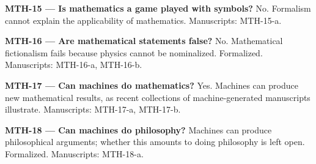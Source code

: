 \documentclass[10pt]{article}
\begin{document}
\textbf{MTH-15 --- Is mathematics a game played with symbols?} No. Formalism cannot explain the applicability of mathematics. Manuscripts: MTH-15-a.

\textbf{MTH-16 --- Are mathematical statements false?} No. Mathematical fictionalism fails because physics cannot be nominalized. Formalized. Manuscripts: MTH-16-a, MTH-16-b.

\textbf{MTH-17 --- Can machines do mathematics?} Yes. Machines can produce new mathematical results, as recent collections of machine-generated manuscripts illustrate. Manuscripts: MTH-17-a, MTH-17-b.

\textbf{MTH-18 --- Can machines do philosophy?} Machines can produce philosophical arguments; whether this amounts to doing philosophy is left open. Formalized. Manuscripts: MTH-18-a.
\end{document}

